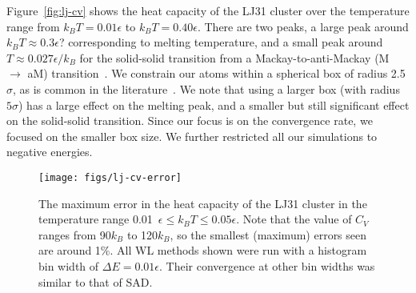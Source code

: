 \documentclass[letterpaper,twocolumn,amsmath,amssymb,pre,aps,10pt]{revtex4-1}
\begin{document}

Figure~\ref{fig:lj-cv} shows the heat capacity of the LJ31 cluster
over the temperature range from $k_BT=0.01\epsilon$ to
$k_BT=0.40\epsilon$.  There are two peaks, a large peak around $k_BT
\approx 0.3\epsilon$? corresponding to melting temperature, and a
small peak around $T \approx 0.027\epsilon/k_B$ for the solid-solid
transition from a Mackay-to-anti-Mackay (M $\rightarrow$ aM)
transition~\cite{doye1997thermally, hendy2001molecular,
  mandelshtam2006multiple}.  We constrain our atoms within a spherical
box of radius 2.5$\sigma$, as is common in the
literature~\cite{poulain2006performances, mandelshtam2006multiple}.
We note that using a larger box (with radius $5\sigma$) has a large
effect on the melting peak, and a smaller but still significant effect
on the solid-solid transition.  Since our focus is on the convergence
rate, we focused on the smaller box size.  We further restricted all
our simulations to negative energies.

\begin{figure}
  \texttt{[image: figs/lj-cv-error]}
  \caption{The maximum error in the heat capacity of the LJ31 cluster
    in the temperature range 0.01~$\epsilon\le k_BT \le 0.05\epsilon$.
    Note that the value of $C_V$ ranges from 90$k_B$ to 120$k_B$, so
    the smallest (maximum) errors seen are around 1\%.  All WL methods
    shown were run with a histogram bin width of $\Delta
    E=0.01\epsilon$.  Their convergence at other bin widths was
    similar to that of SAD. }
  \label{fig:lj-cv-error}
\end{figure}
\end{document}
